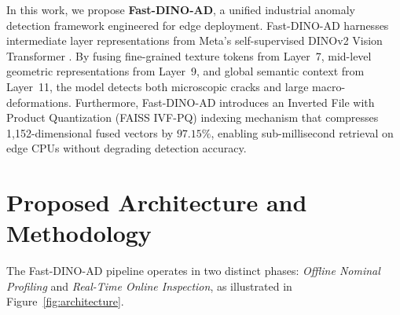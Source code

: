 \documentclass[10pt,journal,compsoc]{IEEEtran}
\begin{document}
In this work, we propose \textbf{Fast-DINO-AD}, a unified industrial anomaly detection framework engineered for edge deployment. Fast-DINO-AD harnesses intermediate layer representations from Meta's self-supervised DINOv2 Vision Transformer \cite{oquab2023dinov2}. By fusing fine-grained texture tokens from Layer~7, mid-level geometric representations from Layer~9, and global semantic context from Layer~11, the model detects both microscopic cracks and large macro-deformations. Furthermore, Fast-DINO-AD introduces an Inverted File with Product Quantization (FAISS IVF-PQ) indexing mechanism that compresses 1,152-dimensional fused vectors by $97.15\%$, enabling sub-millisecond retrieval on edge CPUs without degrading detection accuracy.

\section{Proposed Architecture and Methodology}

The Fast-DINO-AD pipeline operates in two distinct phases: \textit{Offline Nominal Profiling} and \textit{Real-Time Online Inspection}, as illustrated in Figure~\ref{fig:architecture}.
\end{document}
